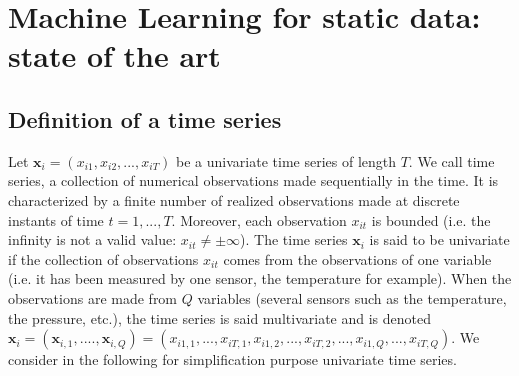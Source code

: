 \chapter{Machine Learning for static data: state of the art}
\label{chap:premierchapitre}
\minitoc




\section{Definition of a time series}
Let $\textbf{x}_i=(x_{i1}, x_{i2}, ..., x_{iT})$ be a univariate time series of length $T$. We call time series, a collection of numerical observations made sequentially in the time. It is characterized by a finite number of realized observations made at discrete instants of time $t=1,...,T$. Moreover, each observation $x_{it}$ is bounded (i.e. the infinity is not a valid value: $x_{it} \neq \pm \infty$). The time series $\textbf{x}_i$ is said to be univariate if the collection of observations $x_{it}$ comes from the observations of one variable (i.e. it has been measured by one sensor, the temperature for example). When the observations are made from $Q$ variables (several sensors such as the temperature, the pressure, etc.), the time series is said multivariate and is denoted $\textbf{x}_i=(\textbf{x}_{i,1}, ...., \textbf{x}_{i,Q})=(x_{i1,1}, ..., x_{iT,1},x_{i1,2}, ..., x_{iT,2}, ..., x_{i1,Q}, ..., x_{iT,Q})$. We consider in the following for simplification purpose univariate time series. 


